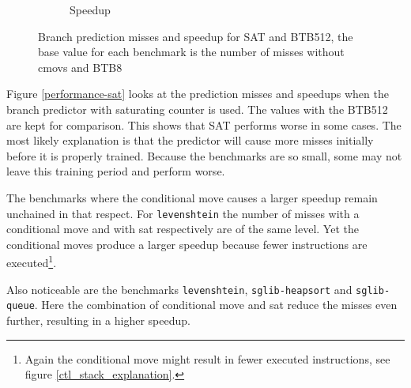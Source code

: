 \documentclass[12pt,twoside,notitlepage]{report}
\begin{document}
\begin{figure}[htp]
\begin{subfigure}[b]{\textwidth}
\caption{Speedup}
\end{subfigure}
\caption{Branch prediction misses and speedup for SAT and BTB512, the base value for each benchmark is the number of misses without cmovs and BTB8}
\end{figure}


Figure \ref{performance-sat} looks at the prediction misses and speedups when the branch predictor with saturating counter is used. The values with the BTB512 are kept for comparison. This shows that SAT performs worse in some cases. The most likely explanation is that the predictor will cause more misses initially before it is properly trained. Because the benchmarks are so small, some may not leave this training period and perform worse.

The benchmarks where the conditional move causes a larger speedup remain unchained in that respect. For \texttt{levenshtein} the number of misses with a conditional move and with \gls{sat} respectively are of the same level. Yet the conditional moves produce a larger speedup because fewer instructions are executed\footnote{Again the conditional move might result in fewer executed instructions, see figure \ref{ctl_stack_explanation}.}.

Also noticeable are the benchmarks \texttt{levenshtein}, \texttt{sglib-heapsort} and \texttt{sglib-queue}. Here the combination of conditional move and \gls{sat} reduce the misses even further, resulting in a higher speedup.
\end{document}
